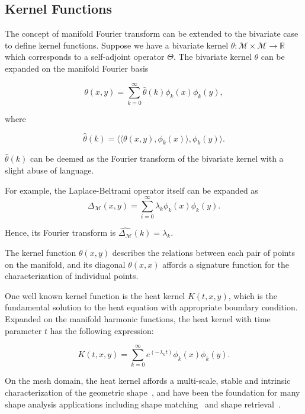 \subsection*{Kernel Functions}

The concept of manifold Fourier transform can be extended to the bivariate case to define kernel functions.
Suppose we have a bivariate kernel 
$\theta:\mathcal{M}\times\mathcal{M}\to\mathbb{R}$ which corresponds to a 
self-adjoint operator $\Theta$. The bivariate kernel $\theta$ can be expanded 
on the manifold Fourier basis

\begin{equation}
\theta(x,y)=\sum_{k=0}^\infty \hat{\theta}(k)\phi_k(x)\phi_k(y),
\end{equation}

where

\begin{equation}
\hat{\theta}(k)=\langle\langle\theta(x,y),\phi_k(x)\rangle,\phi_k(y)\rangle.
\end{equation}

$\hat{\theta}(k)$ can be deemed as the Fourier transform of the bivariate kernel 
with a slight abuse of language.

For example, the Laplace-Beltrami operator itself can be expanded as
\begin{equation}
\Delta_\mathcal{M}(x,y)=\sum_{i=0}^\infty \lambda_k\phi_k(x)\phi_k(y).
\end{equation}

Hence, its Fourier transform is $\widehat{\Delta_\mathcal{M}}(k)=\lambda_k$.

The kernel function $\theta(x,y)$ describes the relations between each pair of 
points on the manifold, and its diagonal $\theta(x,x)$ affords a
signature function for the characterization of individual points. 

One well known kernel function is the heat kernel $K(t,x,y)$, which is
the fundamental solution to the heat equation with appropriate boundary condition. 
Expanded on the manifold harmonic functions, the heat kernel with time parameter 
$t$ has the following expression:

\begin{equation}
K(t,x,y)=\sum_{k=0}^{\infty} e^(-\lambda_k t) \phi_k(x)\phi_k(y).
\end{equation}

On the mesh domain, the heat kernel affords a multi-scale, stable and intrinsic
characterization of the geometric shape~\cite{Sun:2009:CGF}, and have been 
the foundation for many shape analysis applications including shape matching~\cite{Ovsjanikov2010}
and shape retrieval~\cite{Bronstein2011}. 



